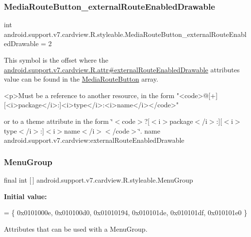 \subsubsection{\texorpdfstring{Media\+Route\+Button\+\_\+external\+Route\+Enabled\+Drawable}{MediaRouteButton\_externalRouteEnabledDrawable}}
{\footnotesize\ttfamily int android.\+support.\+v7.\+cardview.\+R.\+styleable.\+Media\+Route\+Button\+\_\+external\+Route\+Enabled\+Drawable = 2\hspace{0.3cm}{\ttfamily [static]}}

This symbol is the offset where the \hyperlink{classandroid_1_1support_1_1v7_1_1cardview_1_1R_1_1attr_aedee62fbf24091473b5ad19638db6930}{android.\+support.\+v7.\+cardview.\+R.\+attr\#external\+Route\+Enabled\+Drawable} attribute\textquotesingle{}s value can be found in the \hyperlink{classandroid_1_1support_1_1v7_1_1cardview_1_1R_1_1styleable_a90da384eb909a4e564e04a5ea394df19}{Media\+Route\+Button} array.

\begin{DoxyVerb}      <p>Must be a reference to another resource, in the form "<code>@[+][<i>package</i>:]<i>type</i>:<i>name</i></code>"
\end{DoxyVerb}
 or to a theme attribute in the form \char`\"{}$<$code$>$?\mbox{[}$<$i$>$package$<$/i$>$\+:\mbox{]}\mbox{[}$<$i$>$type$<$/i$>$\+:\mbox{]}$<$i$>$name$<$/i$>$$<$/code$>$\char`\"{}.  name android.\+support.\+v7.\+cardview\+:external\+Route\+Enabled\+Drawable \mbox{\label{classandroid_1_1support_1_1v7_1_1cardview_1_1R_1_1styleable_aec12064c9ec8c2dea3c20674737c17ed}} 
\subsubsection{\texorpdfstring{Menu\+Group}{MenuGroup}}
{\footnotesize\ttfamily final int \mbox{[}$\,$\mbox{]} android.\+support.\+v7.\+cardview.\+R.\+styleable.\+Menu\+Group\hspace{0.3cm}{\ttfamily [static]}}

{\bfseries Initial value\+:}
\begin{DoxyCode}
= \{
            0x0101000e, 0x010100d0, 0x01010194, 0x010101de,
            0x010101df, 0x010101e0
        \}
\end{DoxyCode}
Attributes that can be used with a Menu\+Group. 

